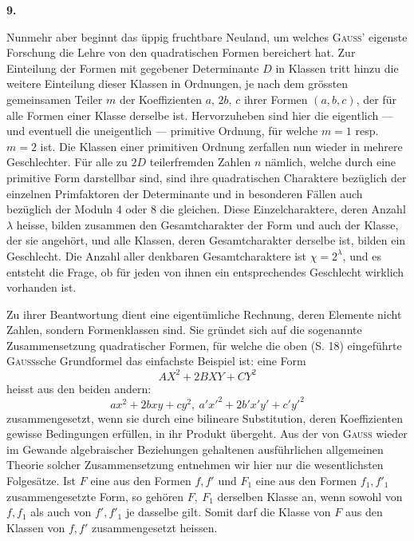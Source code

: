 \begin{center}\bfseries 9.\end{center}
\noindent\hspace*{\parindent}Nunmehr aber beginnt das üppig fruchtbare Neuland, um welches \textsc{Gauss}’ eigenste Forschung die Lehre von den quadratischen Formen bereichert hat. Zur Einteilung der Formen mit gegebener Determinante \(D\) in Klassen tritt
\newpage{}
\noindent hinzu die weitere Einteilung dieser Klassen in Ordnungen, je nach dem grössten gemeinsamen Teiler \(m\) der Koeffizienten \(a,\,2b,\,c\) ihrer Formen \((a,b,c)\), der für alle Formen einer Klasse derselbe ist. Hervorzuheben sind hier die eigentlich — und eventuell die uneigentlich — primitive Ordnung, für welche \(m=1\) resp. \(m=2\) ist. Die Klassen einer primitiven Ordnung zerfallen nun wieder in mehrere Geschlechter. Für alle zu \(2D\) teilerfremden Zahlen \(n\) nämlich, welche durch eine primitive Form darstellbar sind, sind ihre quadratischen Charaktere bezüglich der einzelnen Primfaktoren der Determinante und in besonderen Fällen auch bezüglich der Moduln 4 oder 8 die gleichen. Diese Einzelcharaktere, deren Anzahl \(\lambda\) heisse, bilden zusammen den Gesamtcharakter der Form und auch der Klasse, der sie angehört, und alle Klassen, deren Gesamtcharakter derselbe ist, bilden ein Geschlecht. Die Anzahl aller denkbaren Gesamtcharaktere ist \(\chi=2^\lambda\), und es entsteht die Frage, ob für jeden von ihnen ein entsprechendes Geschlecht wirklich vorhanden ist.

Zu ihrer Beantwortung dient eine eigentümliche Rechnung, deren Elemente nicht Zahlen, sondern Formenklassen sind. Sie gründet sich auf die sogenannte Zusammensetzung quadratischer Formen, für welche die oben (S. 18) eingeführte \textsc{Gauss}sche Grundformel das einfachste Beispiel ist: eine Form
\[
AX^2+2BXY+CY^2
\]
heisst aus den beiden andern:
\[
ax^2+2bxy+cy^2,\ a'x'^2+2b'x'y'+c'y'^2
\]
zusammengesetzt, wenn sie durch eine bilineare Substitution, deren Koeffizienten gewisse Bedingungen erfüllen, in ihr Produkt übergeht. Aus der von \textsc{Gauss} wieder im Gewande algebraischer Beziehungen gehaltenen ausführlichen allgemeinen Theorie solcher Zusammensetzung entnehmen wir hier nur die wesentlichsten Folgesätze. Ist \(F\) eine aus den Formen \(f,f'\) und \(F_1\) eine aus den Formen \(f_1,f'_1\) zusammengesetzte Form, so gehören \(F,\ F_1\) derselben Klasse an, wenn sowohl von \(f,f_1\) als auch von \(f',f'_1\) je dasselbe gilt. Somit darf die Klasse von \(F\) aus den Klassen von \(f,f'\) zusammengesetzt heissen.

